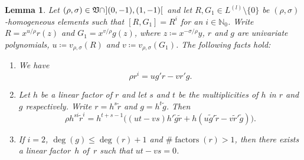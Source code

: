 \documentclass[reqno,a4paper]{amsart}
\newtheorem{lemma}[theorem]{Lemma}
\theoremstyle{definition}
\theoremstyle{remark}
\DeclareMathOperator{\factors}{factors}
\begin{document}
\begin{lemma}\label{factores en jacobiano} Let $(\rho,\sigma)\in\mathfrak{V}\cap \hspace{0.7pt}](0,-1),(1,-1)[\hspace{0.7pt}$ and let $R,G_1\in L^{(l)}\setminus\{0\}$ be $(\rho,\sigma)$-homogeneous elements such that $[R,G_1]=R^i$ for an $i\in \mathds{N}_0$. Write $R= x^{u/\rho}r(z)$ and $G_1=x^{v/\rho}g(z)$, where $z\coloneqq x^{-\sigma/\rho}y$, $r$ and $g$ are univariate polynomials, $u\coloneqq v_{\rho,\sigma}(R)$ and $v\coloneqq  v_{\rho,\sigma}(G_1)$. The following facts hold:

\begin{enumerate}

\smallskip

\item We have
\begin{equation}\label{central1n}
\rho r^i=u g' r - v r'g.
\end{equation}

\smallskip

\item Let $h$ be a linear factor of $r$ and let $s$ and $t$ be the multiplicities of $h$ in $r$ and $g$ re\-spec\-tive\-ly. Write $r=h^s \tilde{r}$ and $g=h^t \tilde{g}$. Then
\begin{equation}\label{ecuacion de multiplicidad}
\rho h^{si}\tilde{r}^i = h^{t+s-1}\bigl((ut-vs)h'\tilde{g}\tilde{r} + h(u \tilde{g}' \tilde{r} - v\tilde{r}' \tilde{g})\bigr).
\end{equation}

\item If $i=2$, $\deg(g)\le \deg(r)+1$ and $\#\factors(r)>1$,  then there exists a linear factor~$h$ of~$r$ such that $ut-vs=0$.

\end{enumerate}

\end{lemma}
\end{document}
